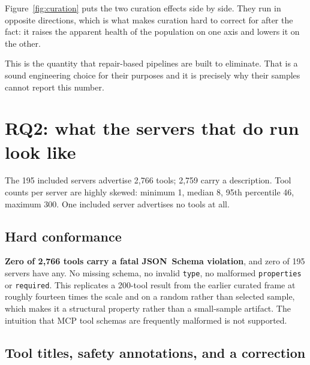 \documentclass[11pt]{article}
\begin{document}
Figure~\ref{fig:curation} puts the two curation effects side by side. They run in
opposite directions, which is what makes curation hard to correct for after the fact:
it raises the apparent health of the population on one axis and lowers it on the other.

This is the quantity that repair-based pipelines are built to eliminate. That is a
sound engineering choice for their purposes and it is precisely why their samples
cannot report this number.

\section{RQ2: what the servers that do run look like}
\label{sec:behavior}

The 195 included servers advertise 2{,}766 tools; 2{,}759 carry a description.
Tool counts per server are highly skewed: minimum 1, median 8, 95th percentile 46,
maximum 300. One included server advertises no tools at all.

\subsection{Hard conformance}
\textbf{Zero of 2{,}766 tools carry a fatal JSON~Schema violation}, and zero of
195 servers have any. No missing schema, no invalid \texttt{type}, no malformed
\texttt{properties} or \texttt{required}. This replicates a 200-tool result from
the earlier curated frame at roughly fourteen times the scale and on a random
rather than selected sample, which makes it a structural property rather than a
small-sample artifact. The intuition that MCP tool schemas are frequently
malformed is not supported.

\subsection{Tool titles, safety annotations, and a correction}
\label{sec:annotations}
\end{document}
